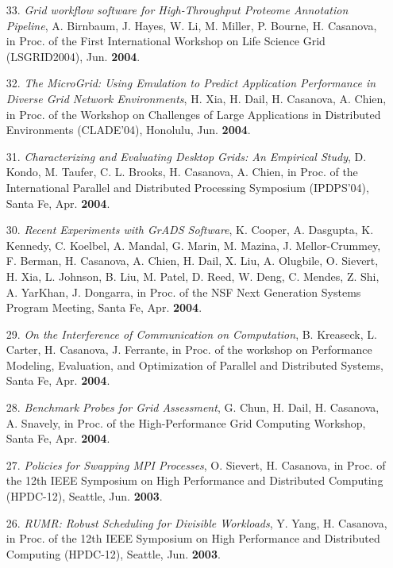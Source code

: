 \begin{enumerate}
\item [33.]
{\it Grid workflow software for High-Throughput Proteome Annotation
Pipeline}, A. Birnbaum, J. Hayes, W. Li, M. Miller, P. Bourne,
H. Casanova, in Proc. of the First International Workshop
on Life Science Grid (LSGRID2004), Jun. {\bf 2004}.

\item [32.]
{\it The MicroGrid: Using Emulation to Predict Application Performance
in Diverse Grid Network Environments}, H. Xia, H. Dail, H. Casanova,
A. Chien, in Proc. of the Workshop on Challenges of Large Applications
in Distributed Environments (CLADE'04), Honolulu, Jun. {\bf 2004}.

\item [31.]
{\it Characterizing and Evaluating Desktop Grids: An Empirical Study},
D. Kondo, M. Taufer, C. L. Brooks, H. Casanova, A. Chien, in Proc.
of the International Parallel and Distributed Processing Symposium
(IPDPS'04), Santa Fe, Apr. {\bf 2004}.

\item [30.]
{\it Recent Experiments with GrADS Software}, K. Cooper, A. Dasgupta,
K. Kennedy, C. Koelbel, A. Mandal, G. Marin, M. Mazina, J. Mellor-Crummey,
F. Berman, H. Casanova, A. Chien, H. Dail, X. Liu, A. Olugbile,
O. Sievert, H. Xia, L. Johnson, B. Liu, M. Patel, D. Reed, W. Deng,
C. Mendes, Z. Shi, A. YarKhan, J. Dongarra, in Proc. of the NSF
Next Generation Systems Program Meeting, Santa Fe, Apr. {\bf 2004}.

\item [29.]
{\it On the Interference of Communication on Computation}, B. Kreaseck,
L. Carter, H. Casanova, J. Ferrante, in Proc. of the workshop
on Performance Modeling, Evaluation, and Optimization of Parallel and
Distributed Systems, Santa Fe, Apr. {\bf 2004}.

\item [28.]
{\it Benchmark Probes for Grid Assessment}, G. Chun, H. Dail, H. Casanova,
A. Snavely, in Proc. of the High-Performance Grid Computing
Workshop, Santa Fe, Apr. {\bf 2004}.

\item [27.]
{\it Policies for Swapping MPI Processes}, O. Sievert, H. Casanova,
in Proc. of the 12th IEEE Symposium on High Performance and
Distributed Computing (HPDC-12), Seattle, Jun. {\bf 2003}.


\item [26.]
{\it RUMR: Robust Scheduling for Divisible Workloads}, Y. Yang,
H. Casanova, in Proc. of the 12th IEEE Symposium on High Performance
and Distributed Computing (HPDC-12), Seattle, Jun. {\bf 2003}.


\end{enumerate}
